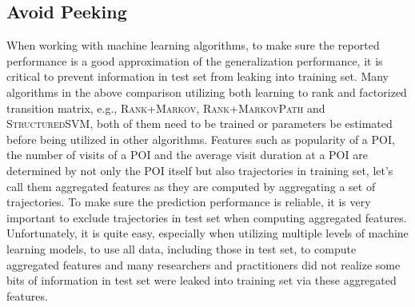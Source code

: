 \subsection{Avoid Peeking}
When working with machine learning algorithms, to make sure the reported performance is a good approximation
of the generalization performance, it is critical to prevent information in test set from leaking into
training set.
Many algorithms in the above comparison utilizing both learning to rank and factorized transition matrix,
e.g., \textsc{Rank+Markov}, \textsc{Rank+MarkovPath} and \textsc{StructuredSVM},
both of them need to be trained or parameters be estimated before being utilized in other algorithms.
Features such as popularity of a POI, the number of visits of a POI and the average visit duration at a POI are
determined by not only the POI itself but also trajectories in training set, let's call them aggregated features as they are 
computed by aggregating a set of trajectories.
To make sure the prediction performance is reliable, it is very important to exclude trajectories in test set 
when computing aggregated features.
Unfortunately, it is quite easy, especially when utilizing multiple levels of machine learning models,
to use all data, including those in test set, to compute aggregated features and many researchers and 
practitioners did not realize some bits of information in test set were leaked into training set via these aggregated features.



